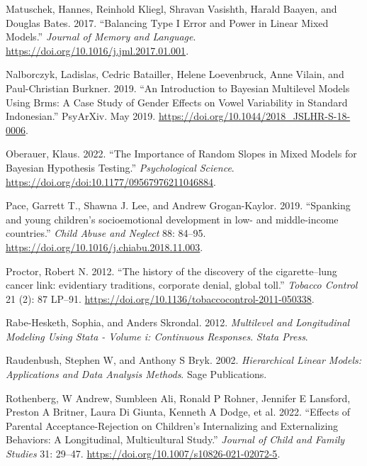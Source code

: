 \documentclass[
  letterpaper,
  DIV=11,
  numbers=noendperiod]{scrreprt}
\newlength{\cslhangindent}
\newlength{\cslentryspacingunit} %
\newenvironment{CSLReferences}[2] %
 {%
  \setlength{\parindent}{0pt}
  \ifodd #1
  \let\oldpar\par
  \def\par{\hangindent=\cslhangindent\oldpar}
  \fi
  \setlength{\parskip}{#2\cslentryspacingunit}
 }%
 {}
\begin{document}
\begin{CSLReferences}{1}{0}
\leavevmode{}%
Matuschek, Hannes, Reinhold Kliegl, Shravan Vasishth, Harald Baayen, and
Douglas Bates. 2017. {``Balancing Type {I} Error and Power in Linear
Mixed Models.''} \emph{Journal of Memory and Language}.
\url{https://doi.org/10.1016/j.jml.2017.01.001}.

\leavevmode{}%
Nalborczyk, Ladislas, Cedric Batailler, Helene Loevenbruck, Anne Vilain,
and Paul-Christian Burkner. 2019. {``An Introduction to {B}ayesian
Multilevel Models Using Brms: A Case Study of Gender Effects on Vowel
Variability in Standard {I}ndonesian.''} PsyArXiv. May 2019.
\url{https://doi.org/10.1044/2018_JSLHR-S-18-0006}.

\leavevmode{}%
Oberauer, Klaus. 2022. {``{The Importance of Random Slopes in Mixed
Models for Bayesian Hypothesis Testing}.''} \emph{Psychological
Science}. \url{https://doi.org/doi:10.1177/09567976211046884}.

\leavevmode{}%
Pace, Garrett T., Shawna J. Lee, and Andrew Grogan-Kaylor. 2019.
{``{Spanking and young children's socioemotional development in low- and
middle-income countries}.''} \emph{Child Abuse and Neglect} 88: 84--95.
\url{https://doi.org/10.1016/j.chiabu.2018.11.003}.

\leavevmode{}%
Proctor, Robert N. 2012. {``{The history of the discovery of the
cigarette--lung cancer link: evidentiary traditions, corporate denial,
global toll}.''} \emph{Tobacco Control} 21 (2): 87 LP--91.
\url{https://doi.org/10.1136/tobaccocontrol-2011-050338}.

\leavevmode{}%
Rabe-Hesketh, Sophia, and Anders Skrondal. 2012. \emph{Multilevel and
Longitudinal Modeling Using Stata - Volume i: Continuous Responses}.
\emph{Stata Press}.

\leavevmode{}%
Raudenbush, Stephen W, and Anthony S Bryk. 2002. \emph{Hierarchical
Linear Models: Applications and Data Analysis Methods}. Sage
Publications.

\leavevmode{}%
Rothenberg, W Andrew, Sumbleen Ali, Ronald P Rohner, Jennifer E
Lansford, Preston A Britner, Laura Di Giunta, Kenneth A Dodge, et al.
2022. {``Effects of Parental Acceptance-Rejection on Children's
Internalizing and Externalizing Behaviors: A Longitudinal, Multicultural
Study.''} \emph{Journal of Child and Family Studies} 31: 29--47.
\url{https://doi.org/10.1007/s10826-021-02072-5}.


\end{CSLReferences}
\end{document}
